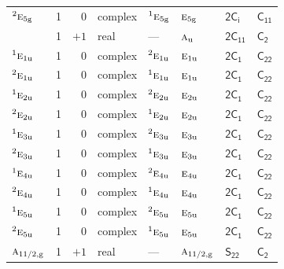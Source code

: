 \documentclass[10pt,a4paper]{article}
\makeatletter
\def\grouprule#1#2{\noalign{\marks\LTgroupmarks{\the\belowrulesep}\nobreak\vskip#1%
  \vskip\aboverulesep}\multispan\LT@cols\unskip{\leaders\hrule\@height#2\hfill\kern\z@}\cr
  \noalign{\penalty\LTrulebreak\vskip\belowrulesep\global\@lastruleclass\z@}}
\numberwithin{equation}{section}
\newcommand{\grp}[1]{\mathsf{#1}}
\newcommand{\irr}[1]{\text{\normalfont\scshape #1}}
\newcommand{\conjpair}[1]{{}^{#1}}
\newcommand{\detbox}[1]{{\setlength{\fboxsep}{1pt}\fbox{#1}}}
\newcommand{\ptag}[1]{\mathrm{#1}}
\makeatother
\begin{document}
{\begin{longtable}{@{}lrrlllll@{}}
$\conjpair{2}\irr{e}_{5\ptag{g}}$ & 1 & $0$ & complex & $\conjpair{1}\irr{e}_{5\ptag{g}}$ & $\irr{e}_{5\ptag{g}}$ & \href{2S2.pdf}{$\grp{2C_{i}}$} & \href{../../../rotation/data/pdf/C11.pdf}{$\grp{C_{11}}$}\\
\detbox{$\irr{a}_{\ptag{u}}$} & 1 & $+1$ & real & --- & $\irr{a}_{\ptag{u}}$ & \href{2C11.pdf}{$\grp{2C_{11}}$} & \href{../../../rotation/data/pdf/C2.pdf}{$\grp{C_{2}}$}\\
$\conjpair{1}\irr{e}_{1\ptag{u}}$ & 1 & $0$ & complex & $\conjpair{2}\irr{e}_{1\ptag{u}}$ & $\irr{e}_{1\ptag{u}}$ & \href{2C1.pdf}{$\grp{2C_{1}}$} & $\grp{C_{22}}$\\
$\conjpair{2}\irr{e}_{1\ptag{u}}$ & 1 & $0$ & complex & $\conjpair{1}\irr{e}_{1\ptag{u}}$ & $\irr{e}_{1\ptag{u}}$ & \href{2C1.pdf}{$\grp{2C_{1}}$} & $\grp{C_{22}}$\\
$\conjpair{1}\irr{e}_{2\ptag{u}}$ & 1 & $0$ & complex & $\conjpair{2}\irr{e}_{2\ptag{u}}$ & $\irr{e}_{2\ptag{u}}$ & \href{2C1.pdf}{$\grp{2C_{1}}$} & $\grp{C_{22}}$\\
$\conjpair{2}\irr{e}_{2\ptag{u}}$ & 1 & $0$ & complex & $\conjpair{1}\irr{e}_{2\ptag{u}}$ & $\irr{e}_{2\ptag{u}}$ & \href{2C1.pdf}{$\grp{2C_{1}}$} & $\grp{C_{22}}$\\
$\conjpair{1}\irr{e}_{3\ptag{u}}$ & 1 & $0$ & complex & $\conjpair{2}\irr{e}_{3\ptag{u}}$ & $\irr{e}_{3\ptag{u}}$ & \href{2C1.pdf}{$\grp{2C_{1}}$} & $\grp{C_{22}}$\\
$\conjpair{2}\irr{e}_{3\ptag{u}}$ & 1 & $0$ & complex & $\conjpair{1}\irr{e}_{3\ptag{u}}$ & $\irr{e}_{3\ptag{u}}$ & \href{2C1.pdf}{$\grp{2C_{1}}$} & $\grp{C_{22}}$\\
$\conjpair{1}\irr{e}_{4\ptag{u}}$ & 1 & $0$ & complex & $\conjpair{2}\irr{e}_{4\ptag{u}}$ & $\irr{e}_{4\ptag{u}}$ & \href{2C1.pdf}{$\grp{2C_{1}}$} & $\grp{C_{22}}$\\
$\conjpair{2}\irr{e}_{4\ptag{u}}$ & 1 & $0$ & complex & $\conjpair{1}\irr{e}_{4\ptag{u}}$ & $\irr{e}_{4\ptag{u}}$ & \href{2C1.pdf}{$\grp{2C_{1}}$} & $\grp{C_{22}}$\\
$\conjpair{1}\irr{e}_{5\ptag{u}}$ & 1 & $0$ & complex & $\conjpair{2}\irr{e}_{5\ptag{u}}$ & $\irr{e}_{5\ptag{u}}$ & \href{2C1.pdf}{$\grp{2C_{1}}$} & $\grp{C_{22}}$\\
$\conjpair{2}\irr{e}_{5\ptag{u}}$ & 1 & $0$ & complex & $\conjpair{1}\irr{e}_{5\ptag{u}}$ & $\irr{e}_{5\ptag{u}}$ & \href{2C1.pdf}{$\grp{2C_{1}}$} & $\grp{C_{22}}$\\
\grouprule{0pt}{\lightrulewidth}
$\irr{a}_{11/2,\ptag{g}}$ & 1 & $+1$ & real & --- & $\irr{a}_{11/2,\ptag{g}}$ & \href{S22.pdf}{$\grp{S_{22}}$} & \href{../../../rotation/data/pdf/C2.pdf}{$\grp{C_{2}}$}\\

\end{longtable}}
\end{document}
